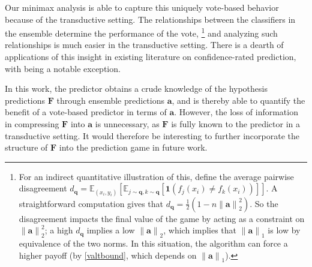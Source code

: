 \documentclass{article}[12pt]
\theoremstyle{named}
\newcommand{\va}{\mathbf{a}}
\newcommand{\vF}{\mathbf{F}}    %
\newcommand{\vq}{\mathbf{q}}
\newcommand{\vnorm}[1]{\left\lVert#1\right\rVert} %
\newcommand{\ifn}{\mathbf{1}} %
\newcommand{\evp}[2]{\mathbb{E}_{#2} \left[#1\right]} %
\newcommand{\lrp}[1]{\left(#1\right)}
\begin{document}
Our minimax analysis is able to capture this uniquely vote-based behavior because of the transductive setting. 
The relationships between the classifiers in the ensemble determine the performance of the vote, 
\footnote{
For an indirect quantitative illustration of this, define the average pairwise disagreement 
$d_\vq = \evp{\evp{\ifn(f_j (x_i) \neq f_k (x_i))}{j \sim \vq , k \sim \vq}}{(x_i, y_i)}$.
A straightforward computation gives that $d_\vq = \frac{1}{2} \lrp{ 1 - n \vnorm{\va}^2_2} $. 
So the disagreement impacts the final value of the game by acting as a constraint on $\vnorm{\va}^2_2$; 
a high $d_\vq$ implies a low $\vnorm{\va}_2$, 
which implies that $\vnorm{\va}_1$ is low by equivalence of the two norms. 
In this situation, the algorithm can force a higher payoff (by \eqref{valtbound}, which depends on $\vnorm{\va}_1$).
}
and analyzing such relationships is much easier in the transductive setting. 
There is a dearth of applications of this insight in existing literature on confidence-rated prediction, 
with \cite{SV08} being a notable exception.

In this work, the predictor obtains a crude knowledge of the hypothesis predictions $\vF$ 
through ensemble predictions $\va$, and is thereby able to quantify the benefit of a vote-based predictor in terms of $\va$. 
However, the loss of information in compressing $\vF$ into $\va$ is unnecessary, 
as $\vF$ is fully known to the predictor in a transductive setting. 
It would therefore be interesting to further incorporate the structure of $\vF$ into the prediction game in future work.





\end{document}

